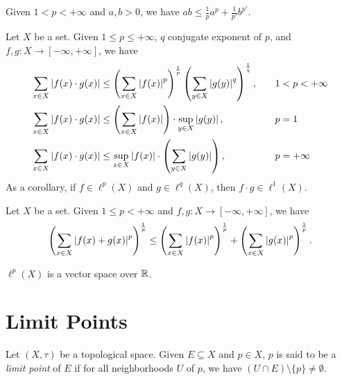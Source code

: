 \documentclass{techreport}
\begin{document}
\begin{theorem}\label{The:YangsInequality}
	Given $1 < p < +\infty$ and $a,b > 0$, we have $ab \le \frac{1}{p} a^p + \frac{1}{p'} b^{p'}$.
\end{theorem}

\begin{theorem}\label{The:HoldersInequality}
	Let $X$ be a set.
	Given $1 \le p \le +\infty$, $q$ conjugate exponent of $p$, and $f,g: X \to [-\infty,+\infty]$, we have
	\begin{alignat*}{2}
		\sum_{x \in X} \left|{f(x) \cdot g(x)}\right| & \le  \left({ \sum_{x \in X} \left|{f(x)}\right|^p }\right)^{\frac{1}{p}} \left({  \sum_{y \in X} \left|{g(y)}\right|^q }\right)^{\frac{1}{q}}, \quad &&  1 < p < +\infty \\
		\sum_{x \in X} \left|{f(x) \cdot g(x)}\right| & \le \left({ \sum_{x \in X} \left|{f(x)}\right| }\right) \cdot \sup_{y \in X} \left|{g(y)}\right|, \quad &&  p=1 \\
		\sum_{x \in X} \left|{f(x) \cdot g(x)}\right| & \le \sup_{x \in X} \left|{f(x)}\right| \cdot \left({ \sum_{y \in X} \left|{g(y)}\right| }\right), \quad && p=+\infty
	\end{alignat*}
	As a corollary, if $f \in \ell^p(X)$ and $g \in \ell^q(X)$, then $f \cdot g \in \ell^1(X)$.
\end{theorem}

\begin{theorem}\label{The:MinkowskisInequality}
	Let $X$ be a set.
	Given $1 \le p < +\infty$ and $f,g:X \to [-\infty,+\infty]$, we have
	\begin{equation*}
		\left({ \sum_{x \in X} \left|{f(x)+g(x)}\right|^p }\right)^{\frac{1}{p}} \le \left({ \sum_{x \in X} \left|{f(x)}\right|^p }\right)^{\frac{1}{p}} + \left({ \sum_{x \in X} \left|{g(x)}\right|^p }\right)^{\frac{1}{p}}.
	\end{equation*}
\end{theorem}

\begin{proposition}\label{Prop:lpVectorSpace}
	$\ell^p(X)$ is a vector space over $\mathbb{R}$.
\end{proposition}

\section{Limit Points}

\begin{definition}\label{De:LimitPoint}
	Let $(X,\tau)$ be a topological space.
	Given $E \subseteq X$ and $p \in X$, $p$ is said to be a \emph{limit point} of $E$ if for all neighborhoods $U$ of $p$, we have $(U \cap E) \setminus \{ p \} \neq \emptyset$.
\end{definition}
\end{document}
